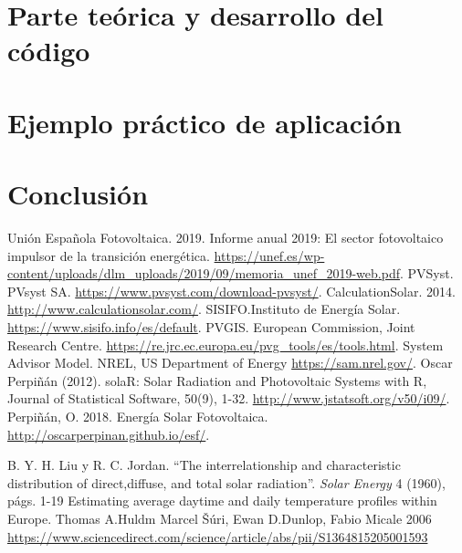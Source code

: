 \documentclass[11pt]{report}
\begin{document}
\chapter{Parte teórica y desarrollo del código}
\label{sec:theory}


\chapter{Ejemplo práctico de aplicación}


\chapter{Conclusión}


\pagebreak

\begin{thebibliography}{99}

 Unión Española Fotovoltaica. 2019. Informe anual 2019: El sector fotovoltaico impulsor de la transición energética. \url{https://unef.es/wp-content/uploads/dlm_uploads/2019/09/memoria_unef_2019-web.pdf}.  
 PVSyst. PVsyst SA.  \url{https://www.pvsyst.com/download-pvsyst/}.  
 CalculationSolar. 2014. \url{http://www.calculationsolar.com/}.
 SISIFO.Instituto de Energía Solar.  \url{https://www.sisifo.info/es/default}.  
 PVGIS. European Commission, Joint Research Centre. \url{https://re.jrc.ec.europa.eu/pvg_tools/es/tools.html}.  
 System Advisor Model. NREL, US Department of Energy \url{https://sam.nrel.gov/}.
   Oscar Perpiñán (2012). solaR: Solar Radiation and Photovoltaic
  Systems with R, Journal of Statistical Software, 50(9), 1-32. \url{http://www.jstatsoft.org/v50/i09/}.  
 Perpiñán, O. 2018. Energía Solar Fotovoltaica. \url{http://oscarperpinan.github.io/esf/}.

B. Y. H. Liu y R. C. Jordan. “The interrelationship and characteristic distribution of direct,diffuse, and total solar radiation”. \textit{Solar Energy} 4 (1960), págs. 1-19
 Estimating average daytime and daily temperature profiles within Europe.  Thomas A.Huldm Marcel Šúri, Ewan D.Dunlop, Fabio Micale 2006  \url{https://www.sciencedirect.com/science/article/abs/pii/S1364815205001593}

\end{thebibliography}
\end{document}
